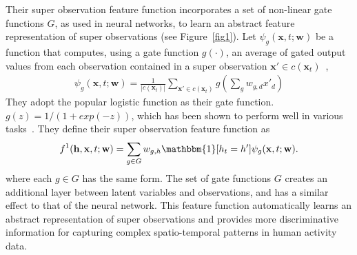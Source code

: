 \documentclass[10pt,twocolumn,letterpaper]{article}
\begin{document}
Their super observation feature function incorporates a set of non-linear gate functions $G$, as used in neural networks, to learn an abstract feature representation of super observations (see Figure~\ref{fig1}). Let $\psi_g(\mathbf{x},t;\mathbf{w})$ be a function that computes, using a gate function $g(\cdot)$, an average of gated output values from each observation contained in a super observation $\mathbf{x}' \in c(\mathbf{x}_t)$~\cite{action},\\
\begin{gather}
\psi_g(\mathbf{x},t;\mathbf{w}) = \frac{1}{|c(\mathbf{x}_t)|}\sum_{\mathbf{x}'\in c(\mathbf{x}_t)}g(\sum_gw_{g,d}x'_d)
\end{gather}
They adopt the popular logistic function as their gate function. $g(z) = 1/(1 + exp(-z))$, which has been shown to perform well in various tasks~\cite{Learning}. They define their super observation feature function as~\cite{action}\\
\begin{gather}
f^1(\mathbf{h},\mathbf{x},t;\mathbf{w}) = \sum_{g\in G}w_{g,h}\mathbbm{1}[h_t = h']\psi_g(\mathbf{x},t;\mathbf{w}).
\end{gather}
where each $g\in G$ has the same form. The set of gate functions $G$ creates an additional layer between latent variables and observations, and has a similar effect to that of the neural network. This feature function automatically learns an abstract representation of super observations and provides more discriminative information for capturing complex spatio-temporal patterns in human activity data.


{\small


}
\end{document}
